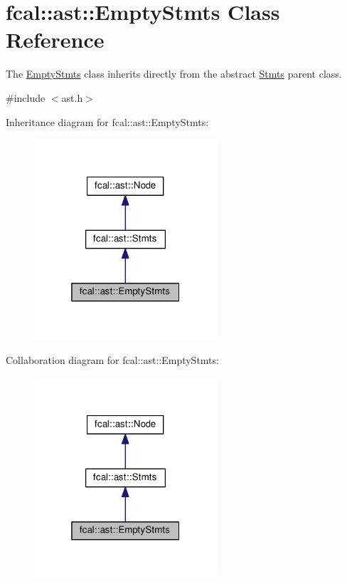 \hypertarget{classfcal_1_1ast_1_1EmptyStmts}{}\section{fcal\+:\+:ast\+:\+:Empty\+Stmts Class Reference}
\label{classfcal_1_1ast_1_1EmptyStmts}


The \hyperlink{classfcal_1_1ast_1_1EmptyStmts}{Empty\+Stmts} class inherits directly from the abstract \hyperlink{classfcal_1_1ast_1_1Stmts}{Stmts} parent class.  




{\ttfamily \#include $<$ast.\+h$>$}



Inheritance diagram for fcal\+:\+:ast\+:\+:Empty\+Stmts\+:\nopagebreak
\begin{figure}[H]
\begin{center}
\leavevmode
\includegraphics[width=193pt]{classfcal_1_1ast_1_1EmptyStmts__inherit__graph}
\end{center}
\end{figure}


Collaboration diagram for fcal\+:\+:ast\+:\+:Empty\+Stmts\+:\nopagebreak
\begin{figure}[H]
\begin{center}
\leavevmode
\includegraphics[width=193pt]{classfcal_1_1ast_1_1EmptyStmts__coll__graph}
\end{center}
\end{figure}
